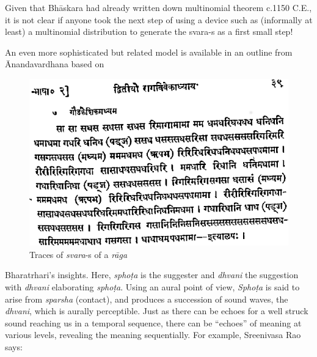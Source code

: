 Given that Bhāskara had already written down multinomial theorem c.1150 C.E., it is not clear if anyone took the next step of using a device such as (informally at least) a multinomial distribution to generate the svara-s as a first small step!

An even more sophisticated but related model is available in an outline from Ānandavardhana based on 
\begin{figure}[H]
\centering
\includegraphics{figures/6.eps}
\caption{Traces of \textsl{svara}-s of a \textsl{rāga}}\label{chap7-fig4}
\end{figure}

Bharatrhari’s insights. Here, \textsl{sphoṭa} is the suggester and \textsl{dhvani} the suggestion with \textsl{dhvani} elaborating \textsl{sphoṭa}. Using an aural point of view, \textsl{Sphoṭa} is said to arise from \textsl{sparsha} (contact), and produces a succession of sound waves, the \textsl{dhvani}, which is aurally perceptible. Just as there can be echoes for a well struck sound reaching us in a temporal sequence, there can be “echoes” of meaning at various levels, revealing the meaning sequentially. For example, Sreenivasa Rao says:

